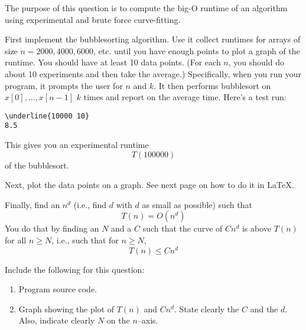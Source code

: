 The purpose of this question is to compute the big-O runtime
of an algorithm using experimental and brute force curve-fitting.

First implement the bubblesorting algorithm.
Use it collect runtimes for arrays of size $n = 2000, 4000, 6000$, etc.
until you have enough points to plot a graph of the runtime.
You should have at least 10 data points.
(For each $n$, you should do about 10 experiments and then take
the average.)
Specifically, when you run your program, it prompts
the user for $n$ and $k$.
It then
performs bubblesort on $x[0], ..., x[n-1]$ $k$ times and
report on the average time.
Here's a test run:
\begin{Verbatim}[fontsize=\small,frame=single, commandchars=\\\{\}]
\underline{10000 10}
8.5
\end{Verbatim}
This gives you an experimental runtime
\[
T(100000)
\]
of the bubblesort.

Next, plot the data points on a graph.
See next page on how to do it in \LaTeX.

Finally, find an $n^d$ (i.e., find $d$ with $d$ as small as possible)
such that
\[
T(n) = O(n^d)
\]
You do that by finding an $N$ and a $C$ such that
the curve of $Cn^d$ is above $T(n)$ for all $n \geq N$, i.e.,
such that for $n \geq N$,
\[
T(n) \leq C n^d
\]

Include the following for this question:
\begin{enumerate}[nosep]
  \item Program source code.
  \item Graph showing the plot of $T(n)$ and $Cn^d$. State clearly the $C$
  and the $d$. Also, indicate clearly $N$ on the $n$--axis.
\end{enumerate}

